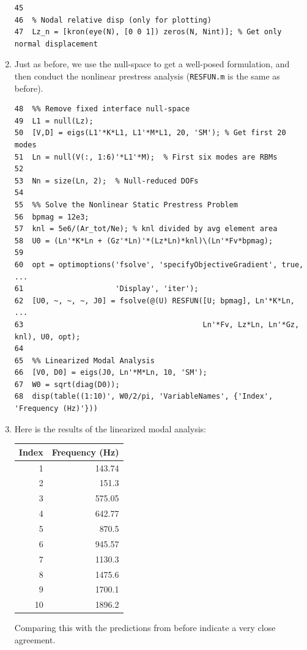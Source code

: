 \documentclass[11pt]{article}
\begin{document}
\begin{enumerate}
\begin{verbatim}
45  
46  % Nodal relative disp (only for plotting)
47  Lz_n = [kron(eye(N), [0 0 1]) zeros(N, Nint)]; % Get only normal displacement
\end{verbatim}
\item Just as before, we use the null-space to get a well-posed formulation, and then conduct the nonlinear prestress analysis (\texttt{RESFUN.m} is the same as before).
\begin{verbatim}
48  %% Remove fixed interface null-space
49  L1 = null(Lz);
50  [V,D] = eigs(L1'*K*L1, L1'*M*L1, 20, 'SM'); % Get first 20 modes
51  Ln = null(V(:, 1:6)'*L1'*M);  % First six modes are RBMs
52  
53  Nn = size(Ln, 2);  % Null-reduced DOFs
54  
55  %% Solve the Nonlinear Static Prestress Problem
56  bpmag = 12e3;
57  knl = 5e6/(Ar_tot/Ne); % knl divided by avg element area
58  U0 = (Ln'*K*Ln + (Gz'*Ln)'*(Lz*Ln)*knl)\(Ln'*Fv*bpmag);
59  
60  opt = optimoptions('fsolve', 'specifyObjectiveGradient', true, ...
61                     'Display', 'iter');
62  [U0, ~, ~, ~, J0] = fsolve(@(U) RESFUN([U; bpmag], Ln'*K*Ln, ...
63                                         Ln'*Fv, Lz*Ln, Ln'*Gz, knl), U0, opt);
64  
65  %% Linearized Modal Analysis
66  [V0, D0] = eigs(J0, Ln'*M*Ln, 10, 'SM');
67  W0 = sqrt(diag(D0));
68  disp(table((1:10)', W0/2/pi, 'VariableNames', {'Index', 'Frequency (Hz)'}))
\end{verbatim}
\item Here is the results of the linearized modal analysis:   
\begin{center}
\begin{tabular}{rr}
Index & Frequency (Hz)\\[0pt]
\hline
1 & 143.74\\[0pt]
2 & 151.3\\[0pt]
3 & 575.05\\[0pt]
4 & 642.77\\[0pt]
5 & 870.5\\[0pt]
6 & 945.57\\[0pt]
7 & 1130.3\\[0pt]
8 & 1475.6\\[0pt]
9 & 1700.1\\[0pt]
10 & 1896.2\\[0pt]
\end{tabular}
\end{center}
Comparing this with the predictions from before indicate a very close agreement.
\end{enumerate}
\end{document}
